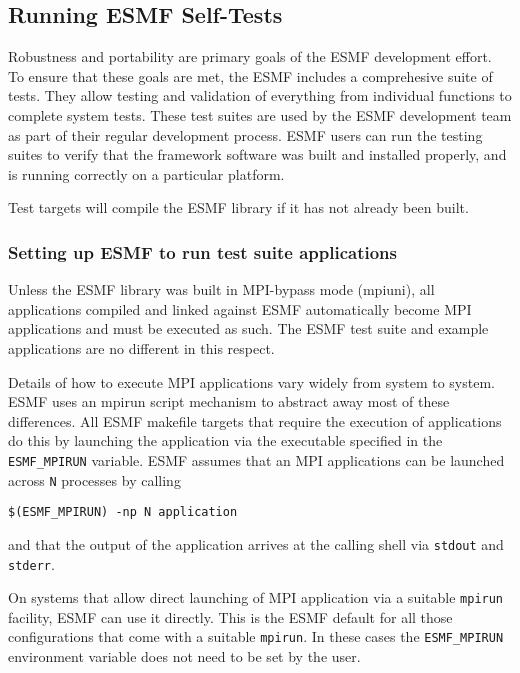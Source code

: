 
\subsection{Running ESMF Self-Tests}
\label{testing}

Robustness and portability are primary goals of the ESMF development
effort.  To ensure that these goals are met, the ESMF includes a
comprehesive suite of tests.  They allow testing and validation of
everything from individual functions to complete system tests.  These
test suites are used by the ESMF development team as part of their
regular development process.  ESMF users can run the testing suites to
verify that the framework software was built and installed properly,
and is running correctly on a particular platform.

Test targets will compile the ESMF library if it has not already been built.

\subsubsection{Setting up ESMF to run test suite applications}
\label{ESMFRunSetting}

Unless the ESMF library was built in MPI-bypass mode (mpiuni), all applications
compiled and linked against ESMF automatically become MPI applications and must
be executed as such. The ESMF test suite and example applications are no
different in this respect.

Details of how to execute MPI applications vary widely from system to system.
ESMF uses an mpirun script mechanism to abstract away most of these differences.
All ESMF makefile targets that require the execution of applications do this by
launching the application via the executable specified in the 
{\tt ESMF\_MPIRUN} variable. ESMF assumes that an MPI applications can be 
launched across {\tt N} processes by calling

\begin{verbatim}
$(ESMF_MPIRUN) -np N application
\end{verbatim}

and that the output of the application arrives at the calling shell via 
{\tt stdout} and {\tt stderr}.

On systems that allow direct launching of MPI application via a suitable
{\tt mpirun} facility, ESMF can use it directly. This is the ESMF default for
all those configurations that come with a suitable {\tt mpirun}. In these
cases the {\tt ESMF\_MPIRUN} environment variable does not need to be set by
the user.


